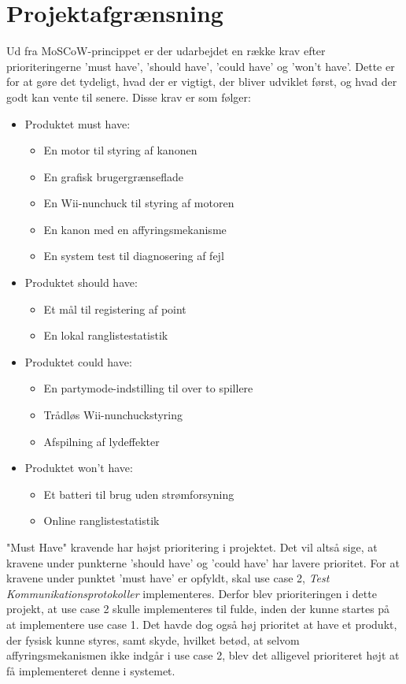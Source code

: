 \chapter{Projektafgrænsning}

Ud fra MoSCoW-princippet er der udarbejdet en række krav efter prioriteringerne ’must have’, ’should have’, ’could have’ og ’won’t have’. Dette er for at gøre det tydeligt, hvad der er vigtigt, der bliver udviklet først, og hvad der godt kan vente til senere. Disse krav er som følger:
\begin{itemize}
	\item Produktet must have:
	\begin{itemize}
		\item En motor til styring af kanonen
		\item En grafisk brugergrænseflade
		\item En Wii-nunchuck til styring af motoren
		\item En kanon med en affyringsmekanisme
		\item En system test til diagnosering af fejl
	\end{itemize}
	\item Produktet should have:
	\begin{itemize}
		\item Et mål til registering af point
		\item En lokal ranglistestatistik
	\end{itemize}
	\item Produktet could have:
	\begin{itemize}
		\item En partymode-indstilling til over to spillere
		\item Trådløs Wii-nunchuckstyring
		\item Afspilning af lydeffekter
	\end{itemize}
	\item Produktet won’t have:
	\begin{itemize}
		\item Et batteri til brug uden strømforsyning
		\item Online ranglistestatistik
	\end{itemize}
\end{itemize}

"Must Have" kravende har højst prioritering i projektet. Det vil altså sige, at kravene under punkterne ’should have’ og ’could have’ har lavere prioritet. For at kravene under punktet 'must have' er opfyldt, skal use case 2, \textit{Test Kommunikationsprotokoller} implementeres. Derfor blev prioriteringen i dette projekt, at use case 2 skulle implementeres til fulde, inden der kunne startes på at implementere use case 1. Det havde dog også høj prioritet at have et produkt, der fysisk kunne styres, samt skyde, hvilket betød, at selvom affyringsmekanismen ikke indgår i use case 2, blev det alligevel prioriteret højt at få implementeret denne i systemet.






